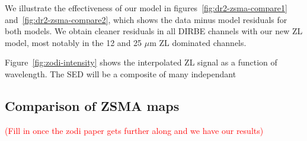 \documentclass[twocolumn]{aa}
\begin{document}
We illustrate the effectiveness of our model in figures~\ref{fig:dr2-zsma-compare1} 
and~\ref{fig:dr2-zsma-compare2}, which shows the data minus model residuals for both models.
We obtain cleaner residuals in all DIRBE channels with our new ZL model, most notably in the 12 and 25 $\mu$m  
ZL dominated channels.

Figure~\ref{fig:zodi-intensity} shows the interpolated ZL signal as a function of wavelength. The SED will be a composite of many independant 


\subsection{Comparison of ZSMA maps}

\textcolor{red}{(Fill in once the zodi paper gets further along and we have our results)}
\end{document}
